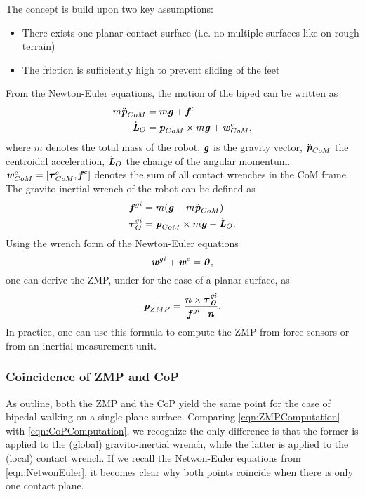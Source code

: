 The concept is build upon two key assumptions:
\begin{itemize}
\item There exists one planar contact surface (i.e. no multiple surfaces like on rough terrain)
\item The friction is sufficiently high to prevent sliding of the feet
\end{itemize}
From the Newton-Euler equations, the motion of the biped can be written as
\begin{align*}
m\ddot{\bm{\mathit{p}}}_{CoM} &= m\bm{\mathit{g}}+\bm{\mathit{f}}^c \\
\dot{\bm{\mathit{L}}}_O &= \bm{\mathit{p}}_{CoM}\times m\bm{\mathit{g}}+\bm{\mathit{w}}_{CoM}^c,
\end{align*}
where $m$ denotes the total mass of the robot, $\bm{\mathit{g}}$ is the gravity vector, $\ddot{\bm{\mathit{p}}}_{CoM}$ the centroidal acceleration, $\dot{\bm{\mathit{L}}}_O$ the change of the angular momentum. $\bm{\mathit{w}}_{CoM}^c=[\bm{\mathit{\tau}}_{CoM}^c, \bm{\mathit{f}}^c]$ denotes the sum of all contact wrenches in the \gls{CoM} frame. The gravito-inertial wrench of the robot can be defined as
\begin{align*}
\bm{\mathit{f}}^{gi} &= m(\bm{\mathit{g}}-m\ddot{\bm{\mathit{p}}}_{CoM}) \\
\bm{\mathit{\tau}}_O^{gi} &= \bm{\mathit{p}}_{CoM}\times m\bm{\mathit{g}}-\dot{\bm{\mathit{L}}}_O.
\end{align*}
Using the wrench form of the Newton-Euler equations
\begin{equation}\label{eqn:NetwonEuler} 
\bm{\mathit{w}}^{gi}+\bm{\mathit{w}}^c=\bm{\mathit{0}},
\end{equation}
one can derive the \gls{ZMP}, under for the case of a planar surface, as
\begin{equation}\label{eqn:ZMPComputation}
\bm{\mathit{p}}_{ZMP}=\dfrac{\bm{\mathit{n}}\times\bm{\mathit{\bm{\mathit{\tau}}_O^{gi}}}}{\bm{\mathit{f}}^{gi}\cdot\bm{\mathit{n}}}.
\end{equation}
In practice, one can use this formula to compute the \gls{ZMP} from force sensors or from an inertial measurement unit. 
\subsubsection{Coincidence of ZMP and CoP}
As \citeauthor{sardain2004forces} outline, both the \gls{ZMP} and the \gls{CoP} yield the same point for the case of bipedal walking on a single plane surface. 
Comparing \cref{eqn:ZMPComputation} with \cref{eqn:CoPComputation}, we recognize the only difference is that the former is applied to the (global) gravito-inertial wrench, while the latter is applied to the (local) contact wrench. If we recall the Netwon-Euler equations from \cref{eqn:NetwonEuler}, it becomes clear why both points coincide when there is only one contact plane.

